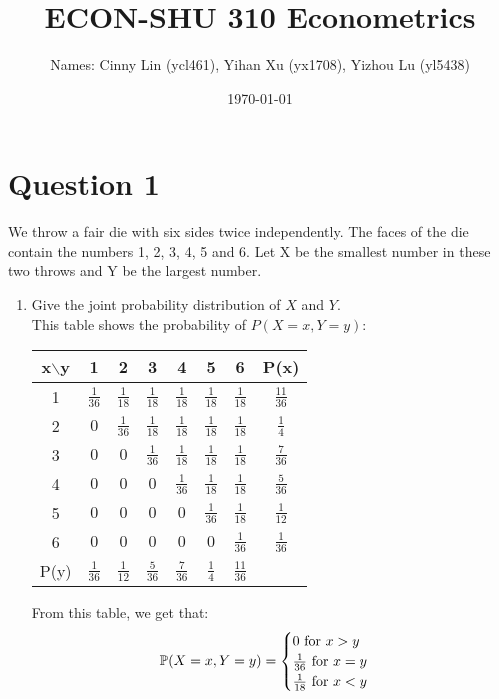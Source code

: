 \documentclass[12pt]{article}%
\begin{document}
\title{ECON-SHU 310 Econometrics}
\author{Names: Cinny Lin (ycl461), Yihan Xu (yx1708), Yizhou Lu (yl5438)}
\date{\today}
\maketitle

\section{Question 1}
\onehalfspacing

We throw a fair die with six sides twice independently. The faces of the die contain the numbers 1, 2, 3, 4, 5 and 6. Let X be the smallest number in these two throws and Y be the largest number.

\begin{enumerate}
    \item Give the joint probability distribution of $X$ and $Y$.\\
\doublespacing
\color{blue}
This table shows the probability of $P(X=x, Y=y)$:
\begin{center}
\begin{tabular}{ ||c | c c c c c c | c|| } 
 \hline
 x$\backslash$y & 1 & 2 & 3 & 4 & 5 & 6 & P(x) \\ 
 \hline
 1 & $\frac{1}{36}$ & $\frac{1}{18}$ & $\frac{1}{18}$ & $\frac{1}{18}$ & $\frac{1}{18}$ & $\frac{1}{18}$ & $\frac{11}{36}$ \\
 2 & $0$ & $\frac{1}{36}$ & $\frac{1}{18}$ & $\frac{1}{18}$ & $\frac{1}{18}$ & $\frac{1}{18}$ & $\frac{1}{4}$ \\
 3 & $0$ & $0$ & $\frac{1}{36}$ & $\frac{1}{18}$ & $\frac{1}{18}$ & $\frac{1}{18}$ & $\frac{7}{36}$ \\
 4 & $0$ & $0$ & $0$ & $\frac{1}{36}$ & $\frac{1}{18}$ & $\frac{1}{18}$ & $\frac{5}{36}$ \\
 5 & $0$ & $0$ & $0$ & $0$ & $\frac{1}{36}$ & $\frac{1}{18}$ & $\frac{1}{12}$ \\
 6 & $0$ & $0$ & $0$ & $0$ & $0$ & $\frac{1}{36}$ & $\frac{1}{36}$ \\
 \hline
 P(y) & $\frac{1}{36}$ & $\frac{1}{12}$ & $\frac{5}{36}$ & $\frac{7}{36}$ & $\frac{1}{4}$ & $\frac{11}{36}$ &  \\
 \hline
\end{tabular}
\end{center}
From this table, we get that:
\begin{equation*}
  \mathbb{P}(X=x, Y=y) =
    \begin{cases}
      0 $ for $ x > y\\
      \frac{1}{36} $ for $ x = y\\
      \frac{1}{18} $ for $ x < y
    \end{cases}       
\end{equation*}


\end{enumerate}
\end{document}
